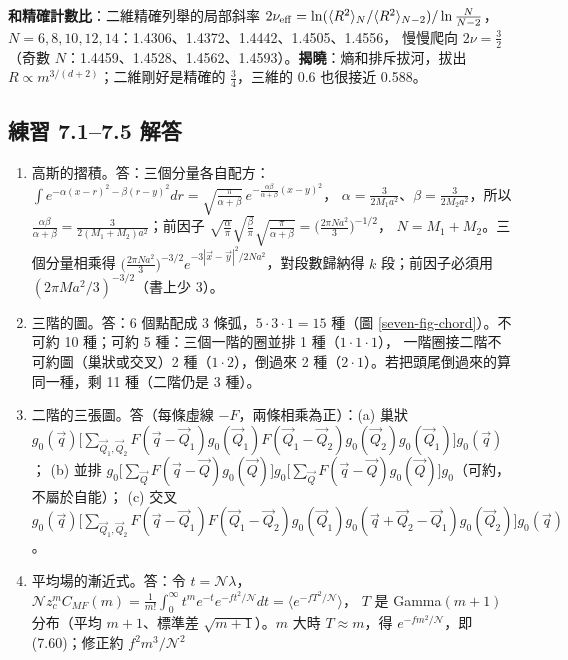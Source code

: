 \textbf{和精確計數比}：二維精確列舉的局部斜率 $2\nu_{\rm eff}=\ln(\langle R^2\rangle_N/\langle R^2\rangle_{N-2})/\ln\frac N{N-2}$，$N=6,8,10,12,14$：1.4306、1.4372、1.4442、1.4505、1.4556，
慢慢爬向 $2\nu=\frac32$（奇數 $N$：1.4459、1.4528、1.4562、1.4593）。\textbf{揭曉}：熵和排斥拔河，拔出 $R\propto m^{3/(d+2)}$；二維剛好是精確的 $\frac34$，三維的 0.6 也很接近 0.588。

\subsection{練習 7.1--7.5 解答}
{\small
\begin{enumerate}[label=\textbf{7.\arabic*},itemsep=0.05em]
\item 高斯的摺積。\quad 答：三個分量各自配方：$\int e^{-\alpha(x-r)^2-\beta(r-y)^2}dr=\sqrt{\frac{\pi}{\alpha+\beta}}\,e^{-\frac{\alpha\beta}{\alpha+\beta}(x-y)^2}$，
$\alpha=\frac{3}{2M_1a^2}$、$\beta=\frac3{2M_2a^2}$，所以 $\frac{\alpha\beta}{\alpha+\beta}=\frac{3}{2(M_1+M_2)a^2}$；前因子 $\sqrt{\frac\alpha\pi}\sqrt{\frac\beta\pi}\sqrt{\frac{\pi}{\alpha+\beta}}=\big(\frac{2\pi Na^2}{3}\big)^{-1/2}$，
$N=M_1+M_2$。三個分量相乘得 $\big(\frac{2\pi Na^2}{3}\big)^{-3/2}e^{-3|\vec x-\vec y|^2/2Na^2}$，對段數歸納得 $k$ 段；前因子必須用 $(2\pi Ma^2/3)^{-3/2}$（書上少 3）。
\item 三階的圖。\quad 答：6 個點配成 3 條弧，$5\cdot3\cdot1=15$ 種（圖 \ref{seven-fig-chord}）。不可約 10 種；可約 5 種：三個一階的圈並排 1 種（$1\cdot1\cdot1$），
一階圈接二階不可約圖（巢狀或交叉）2 種（$1\cdot2$），倒過來 2 種（$2\cdot1$）。若把頭尾倒過來的算同一種，剩 11 種（二階仍是 3 種）。
\item 二階的三張圖。\quad 答（每條虛線 $-F$，兩條相乘為正）：(a) 巢狀 $g_0(\vec q)\Big[\sum_{\vec Q_1,\vec Q_2}F(\vec q-\vec Q_1)g_0(\vec Q_1)F(\vec Q_1-\vec Q_2)g_0(\vec Q_2)g_0(\vec Q_1)\Big]g_0(\vec q)$；
(b) 並排 $g_0\Big[\sum_{\vec Q}F(\vec q-\vec Q)g_0(\vec Q)\Big]g_0\Big[\sum_{\vec Q}F(\vec q-\vec Q)g_0(\vec Q)\Big]g_0$（可約，不屬於自能）；
(c) 交叉 $g_0(\vec q)\Big[\sum_{\vec Q_1,\vec Q_2}F(\vec q-\vec Q_1)F(\vec Q_1-\vec Q_2)g_0(\vec Q_1)g_0(\vec q+\vec Q_2-\vec Q_1)g_0(\vec Q_2)\Big]g_0(\vec q)$。
\item 平均場的漸近式。\quad 答：令 $t=\mathcal N\lambda$，$\mathcal Nz_c^mC_{MF}(m)=\frac1{m!}\int_0^\infty t^me^{-t}e^{-ft^2/\mathcal N}dt=\langle e^{-fT^2/\mathcal N}\rangle$，
$T$ 是 Gamma$(m+1)$ 分布（平均 $m+1$、標準差 $\sqrt{m+1}$）。$m$ 大時 $T\approx m$，得 $e^{-fm^2/\mathcal N}$，即 (7.60)；修正約 $f^2m^3/\mathcal N^2$

\end{enumerate}}
